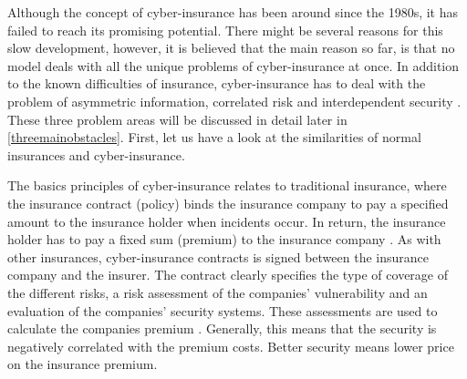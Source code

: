 Although the concept of cyber-insurance has been around since the 1980s, it has failed to reach its promising potential. There might be several reasons for this slow development, however, it is believed that the main reason so far, is that no model deals with all the unique problems of cyber-insurance at once. In addition to the known difficulties of insurance, cyber-insurance has to deal with the problem of asymmetric information, correlated risk and interdependent security \cite{networkgames}. These three problem areas will be discussed in detail later in \ref{threemainobstacles}. First, let us have a look at the similarities of normal insurances and cyber-insurance. 

The basics principles of cyber-insurance relates to traditional insurance, where the insurance contract (policy) binds the insurance company to pay a specified amount to the insurance holder when incidents occur. In return, the insurance holder has to pay a fixed sum (premium) to the insurance company
   \cite{robinson2012incentives}.
    As with other insurances, cyber-insurance contracts is signed between the insurance company and the insurer. The contract clearly specifies the type of coverage of the different risks, a risk assessment of the companies’ vulnerability and an evaluation of the companies’ security systems. These assessments are used to calculate the companies premium \cite{robinson2012incentives}. Generally, this means that the security is negatively correlated with the premium costs. Better security means lower price on the insurance premium.

